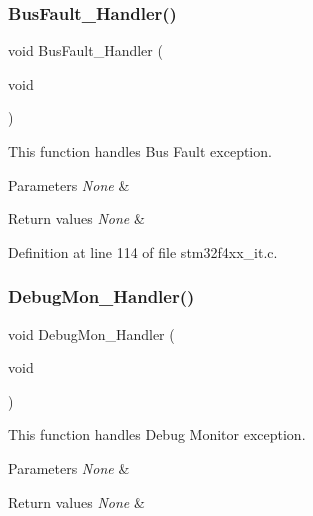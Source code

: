 \subsubsection{\texorpdfstring{Bus\+Fault\+\_\+\+Handler()}{BusFault\_Handler()}}
{\footnotesize\ttfamily void Bus\+Fault\+\_\+\+Handler (\begin{DoxyParamCaption}\item[{void}]{ }\end{DoxyParamCaption})}



This function handles Bus Fault exception. 


\begin{DoxyParams}{Parameters}
{\em None} & \\
\hline
\end{DoxyParams}

\begin{DoxyRetVals}{Return values}
{\em None} & \\
\hline
\end{DoxyRetVals}


Definition at line 114 of file stm32f4xx\+\_\+it.\+c.

\mbox{\label{group___templates_gadbdfb05858cc36fc520974df37ec3cb0}} 
\subsubsection{\texorpdfstring{Debug\+Mon\+\_\+\+Handler()}{DebugMon\_Handler()}}
{\footnotesize\ttfamily void Debug\+Mon\+\_\+\+Handler (\begin{DoxyParamCaption}\item[{void}]{ }\end{DoxyParamCaption})}



This function handles Debug Monitor exception. 


\begin{DoxyParams}{Parameters}
{\em None} & \\
\hline
\end{DoxyParams}

\begin{DoxyRetVals}{Return values}
{\em None} & \\
\hline
\end{DoxyRetVals}


